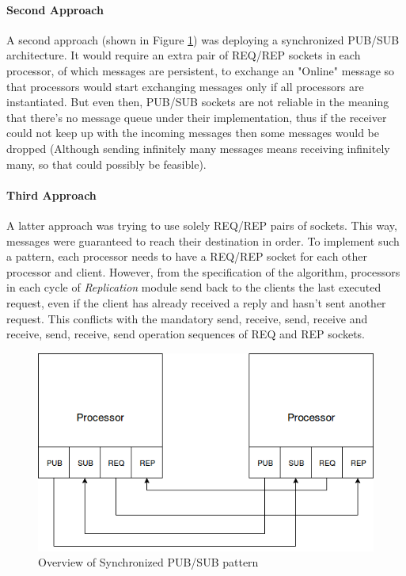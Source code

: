 \documentclass[12pt,a4paper]{report}
\begin{document}
    		    \paragraph{Second Approach}
    		    A second approach (shown in Figure \ref{fig:syncedpubsub}) was deploying a synchronized PUB/SUB architecture. It would require an extra pair of REQ/REP sockets in each processor, of which messages are persistent, to exchange an "Online" message so that processors would start exchanging messages only if all processors are instantiated. But even then, PUB/SUB sockets are not reliable in the meaning that there's no message queue under their implementation, thus if the receiver could not keep up with the incoming messages then some messages would be dropped (Although sending infinitely many messages means receiving infinitely many, so that could possibly be feasible).
    		   		

    		    \paragraph{Third Approach}
    		    A latter approach was trying to use solely REQ/REP pairs of sockets. This way, messages were guaranteed to reach their destination in order. To implement such a pattern, each processor needs to have a REQ/REP socket for each other processor and client. However, from the specification of the algorithm, processors in each cycle of \textit{Replication} module send back to the clients the last executed request, even if the client has already received a reply and hasn't sent another request. This conflicts with the mandatory send, receive, send, receive and receive, send, receive, send operation sequences of REQ and REP sockets.
    		     \begin{figure}
    		        \centering
    		        \includegraphics[scale=0.6]{ade/messenger2.png}
    		        \caption{Overview of Synchronized PUB/SUB pattern}
    		        \label{fig:syncedpubsub}
    		    \end{figure}
    		    		
\end{document}
